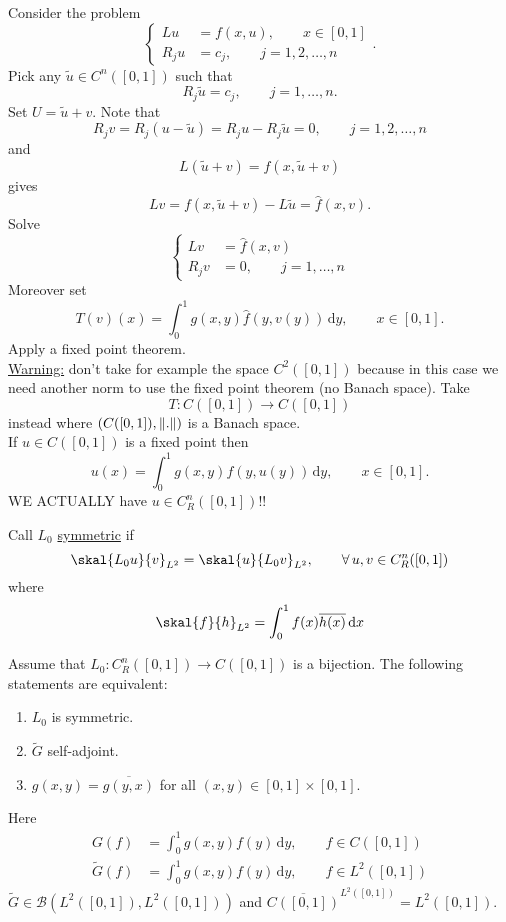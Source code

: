 \begin{bemerkung}
	Consider the problem
	\[
		\begin{cases}
			Lu &= f(x,u), \qquad x \in [0,1] \\
			R_ju &= c_j, \qquad j=1,2,\dots,n
		\end{cases}.
	\]
	Pick any $\tilde u \in C^n([0,1])$ such that
	\[
		R_j \tilde u = c_j, \qquad j=1, \dots,n.
	\]
	Set $U =  \tilde u + v$. Note that 
	\[
		R_jv= R_j(u- \tilde u) = R_ju - R_j \tilde u = 0, \qquad j =1,2,\dots,n
	\]
	and
	\[
		L( \tilde u + v) = f(x, \tilde u + v)
	\]
	gives \[
		Lv = f(x, \tilde u + v) - L \tilde u = \hat f(x,v).
	\] 
	Solve 
	\[
		\begin{cases}
			Lv &= \hat f (x,v) \\
			R_jv &=0, \qquad j=1, \dots,n
		\end{cases}
	\]
	Moreover set \[
		T(v)(x) = \int_{0}^{1}g(x,y) \hat f(y, v(y)) \,\mathrm{d}y, \qquad x \in [0,1].
	\]
	Apply a fixed point theorem. \\ \underline{Warning:} don't take for example the space $C^2([0,1])$ because in this case we need another norm to use the fixed point theorem (no Banach space). Take
	\[
		T : C([0,1]) \to  C([0,1])
	\] instead where $(C([0,1]), \norm{.})$ is a Banach space. \\
If $u \in C([0,1])$ is a fixed point then
\[
	u(x) = \int_{0}^{1}g(x,y) f(y,u(y)) \,\mathrm{d}y, \qquad  x \in [0,1].
\]
WE ACTUALLY have $u \in C_R^n([0,1])$!!
\end{bemerkung}
\begin{definition*}
	Call $L_0$ \underline{symmetric} if 
	\[
		\skal{L_0u}{v}_{L^2} = \skal{u}{L_0v}_{L^2}, \qquad \forall\, u,v \in C_R^n([0,1])
	\]
	where
	\[
		\skal{f}{h}_{L^2} = \int_{0}^{1}f(x) \overline{h(x)} \,\mathrm{d}x
	\]
\end{definition*}
\begin{theorem}
	Assume that $L_0: C_R^n([0,1]) \to C([0,1])$ is a bijection. The following statements are equivalent:
	\begin{enumerate}
		\item $L_0$ is symmetric.
		\item $\tilde G$ self-adjoint. 
		\item $g(x,y) = \overline{g(y,x)}$ for all $(x,y) \in [0,1] \times [0,1]$.
	\end{enumerate}
	Here \begin{align*}
				G(f) &= \int_{0}^{1}g(x,y)f(y) \,\mathrm{d}y, \qquad  f \in C([0,1]) \\
				\tilde G(f) &= \int_{0}^{1}g(x,y)f(y) \,\mathrm{d}y, \qquad f \in L^2([0,1])
	\end{align*}
	$\tilde G \in \mathcal{B}(L^2([0,1]),L^2([0,1]))$ and $\overline{C([0,1])}^{L^2([0,1])} = L^2([0,1])$. \\
\end{theorem}


